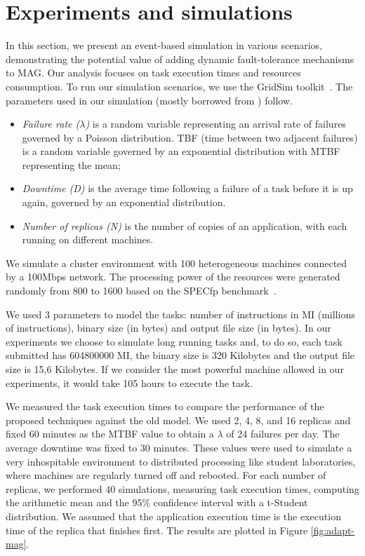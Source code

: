 \documentclass{sig-alternate}
\begin{document}
\section{Experiments and simulations}\label{sec:eval}

In this section, we present an event-based simulation in various scenarios,
demonstrating the potential value of adding dynamic fault-tolerance mechanisms
to MAG. Our analysis focuses on task execution times and resources consumption.
To run our simulation scenarios, we use the GridSim toolkit~\cite{buyya02}. The
parameters used in our simulation (mostly borrowed from \cite{plank98,
beguelin97}) follow. 

\begin{itemize}
    \item \emph{Failure rate ($\lambda$)} is a random variable
representing an arrival rate of failures governed by a Poisson distribution.
TBF (time between two adjacent failures) is a random variable governed by an
exponential distribution with MTBF representing the mean;
    
    \item \emph{Downtime (D)} is the average time following a failure of a
task before it is up again, governed by an exponential distribution.
   
    \item \emph{Number of replicas (N)} is the number of copies of an
application, with each running on different machines.  
\end{itemize}

We simulate a cluster environment with 100 heterogeneous machines connected by
a 100Mbps network. The processing power of the resources were generated
randomly from 800 to 1600 based on the SPECfp benchmark~\cite{spec06}.

We used 3 parameters to model the tasks: number of instructions in MI (millions
of instructions), binary size (in bytes) and output file size (in bytes). In
our experiments we choose to simulate long running tasks and, to do so, each
task submitted has 604800000 MI, the binary size is 320 Kilobytes and the
output file size is 15,6 Kilobytes. If we consider the most powerful machine
allowed in our experiments, it would take 105 hours to execute the task.

We measured the task execution times to compare the performance of the proposed
techniques against the old model. We used 2, 4, 8, and 16 replicas and fixed 60
minutes as the MTBF value to obtain a $\lambda$ of 24 failures per day. The
average downtime was fixed to 30 minutes. These values were used to simulate a
very inhospitable environment to distributed processing like student
laboratories, where machines are regularly turned off and rebooted. For each
number of replicas, we performed 40 simulations, measuring task execution
times, computing the arithmetic mean and the 95\% confidence interval with a
t-Student distribution. We assumed that the application execution time is the
execution time of the replica that finishes first. The results are plotted in
Figure \ref{fig:adapt-mag}.
\end{document}
